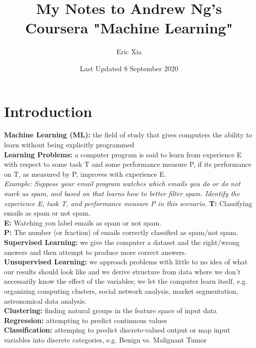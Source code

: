 \documentclass{article}
\title{My Notes to Andrew Ng's Coursera "Machine Learning"}
\author{Eric Xia}
\date{Last Updated 8 September 2020}
\begin{document}
    \maketitle
    \tableofcontents
    \pagebreak

    \section{Introduction}
        \textbf{Machine Learning (ML):} the field of study that gives computers the ability to learn without
        being explicitly programmed \\
        \noindent \textbf{Learning Problems:} a computer program is said to learn from experience E with respect to some
        task T and some performance measure P, if its performance on T, as measured by P, improves with
        experience E. \\

        \noindent \textit{Example: Suppose your email program watches which emails you do or do not mark as spam, and based on
        that learns how to better filter spam. Identify the experience E, task T, and performance measure P
        in this scenario.}
        \noindent \textbf{T:} Classifying emails as spam or not spam. \\
        \noindent \textbf{E:} Watching you label emails as spam or not spam. \\
        \noindent \textbf{P:} The number (or fraction) of emails correctly classified as spam/not spam. \\

        \noindent \textbf{Supervised Learning:} we give the computer a dataset and the right/wrong answers
        and then attempt to produce more correct answers. \\
        \noindent \textbf{Unsupervised Learning:} we approach problems with little to no idea of what our
        results should look like and we derive structure from data where we don't necessarily know the effect
        of the variables; we let the computer learn itself, e.g. organizing computing clusters, social network
        analysis, market segmentation, astronomical data analysis. \\
        
        \noindent \textbf{Clustering:} finding natural groups in the feature space of input data \\
        \noindent \textbf{Regression:} attempting to predict continuous values \\
        \noindent \textbf{Classification:} attemping to predict discrete-valued output or map input variables
        into discrete categories, e.g. Benign vs. Malignant Tumor \\
\end{document}
